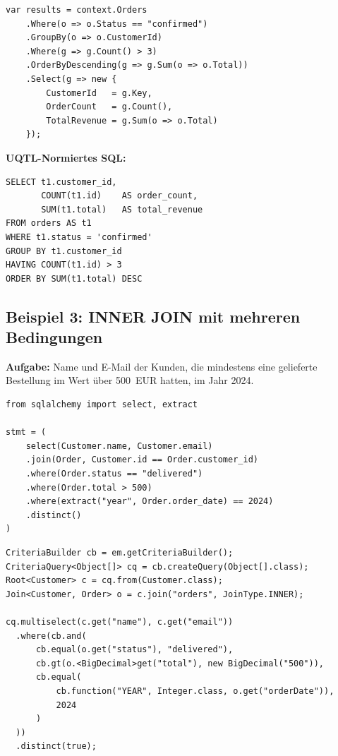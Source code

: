 \begin{lstlisting}[style=csharpstyle, caption={Beispiel 2 -- C\#},
  label=lst:bsp2_cs]
var results = context.Orders
    .Where(o => o.Status == "confirmed")
    .GroupBy(o => o.CustomerId)
    .Where(g => g.Count() > 3)
    .OrderByDescending(g => g.Sum(o => o.Total))
    .Select(g => new {
        CustomerId   = g.Key,
        OrderCount   = g.Count(),
        TotalRevenue = g.Sum(o => o.Total)
    });
\end{lstlisting}

\begin{successbox}
\textbf{UQTL-Normiertes SQL:}
\begin{lstlisting}[style=sqlstyle, numbers=none]
SELECT t1.customer_id,
       COUNT(t1.id)    AS order_count,
       SUM(t1.total)   AS total_revenue
FROM orders AS t1
WHERE t1.status = 'confirmed'
GROUP BY t1.customer_id
HAVING COUNT(t1.id) > 3
ORDER BY SUM(t1.total) DESC
\end{lstlisting}
\end{successbox}

\subsection{Beispiel 3: INNER JOIN mit mehreren Bedingungen}
\label{subsec:bsp3}

\textbf{Aufgabe:} Name und E-Mail der Kunden, die mindestens eine
gelieferte Bestellung im Wert über 500~EUR hatten, im Jahr 2024.

\begin{lstlisting}[style=pythonstyle, caption={Beispiel 3 -- Python (JOIN)},
  label=lst:bsp3_py]
from sqlalchemy import select, extract

stmt = (
    select(Customer.name, Customer.email)
    .join(Order, Customer.id == Order.customer_id)
    .where(Order.status == "delivered")
    .where(Order.total > 500)
    .where(extract("year", Order.order_date) == 2024)
    .distinct()
)
\end{lstlisting}

\begin{lstlisting}[style=javastyle, caption={Beispiel 3 -- Java (JOIN)},
  label=lst:bsp3_java]
CriteriaBuilder cb = em.getCriteriaBuilder();
CriteriaQuery<Object[]> cq = cb.createQuery(Object[].class);
Root<Customer> c = cq.from(Customer.class);
Join<Customer, Order> o = c.join("orders", JoinType.INNER);

cq.multiselect(c.get("name"), c.get("email"))
  .where(cb.and(
      cb.equal(o.get("status"), "delivered"),
      cb.gt(o.<BigDecimal>get("total"), new BigDecimal("500")),
      cb.equal(
          cb.function("YEAR", Integer.class, o.get("orderDate")),
          2024
      )
  ))
  .distinct(true);
\end{lstlisting}

